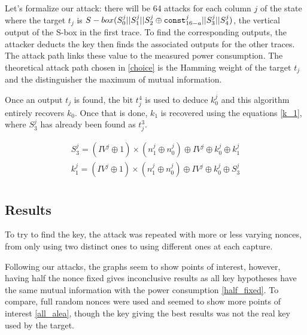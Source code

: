 \documentclass[a4paper,11pt,twocolumn]{article}
\begin{document}
	Let's formalize our attack: there will be 64 attacks for each column $j$ of the state where the target $t_j$ is $S-box(S_0^j||S_1^j||S_2^j \oplus \verb|const|_{16-a}^j||S_3^j||S_4^j)$, the vertical output of the S-box in the first trace. To find the corresponding outputs, the attacker deducts the key then finds the associated outputs for the other traces. The attack path links these value to the measured power consumption. The theoretical attack path chosen in \ref{choice} is the Hamming weight of the target $t_j$ and the distinguisher the maximum of mutual information.
	
	Once an output $t_j$ is found, the bit $t_j^4$ is used to deduce $k_0^j$ and this algorithm entirely recovers $k_0$. Once that is done, $k_1$ is recovered using the equations \ref{k_1}, where $S_3^j$ has already been found as $t_j^3$.
	
	\begin{gather*} \label{k_1}
		S_3^j = (IV^j \oplus 1) \times (n_1^j \oplus n_0^j) \oplus IV^j \oplus k_0^j \oplus k_1^j\\
		k_1^j = (IV^j \oplus 1) \times (n_1^j \oplus n_0^j) \oplus IV^j \oplus k_0^j \oplus S_3^j\\
	\end{gather*}
	
	\subsection{Results}
	To try to find the key, the attack was repeated with more or less varying nonces, from only using two distinct ones to using different ones at each capture.
	
	Following our attacks, the graphs seem to show points of interest, however, having half the nonce fixed gives inconclusive results as all key hypotheses have the same mutual information with the power consumption \ref{half_fixed}. To compare, full random nonces were used and seemed to show more points of interest \ref{all_alea}, though the key giving the best results was not the real key used by the target.
	
\end{document}
